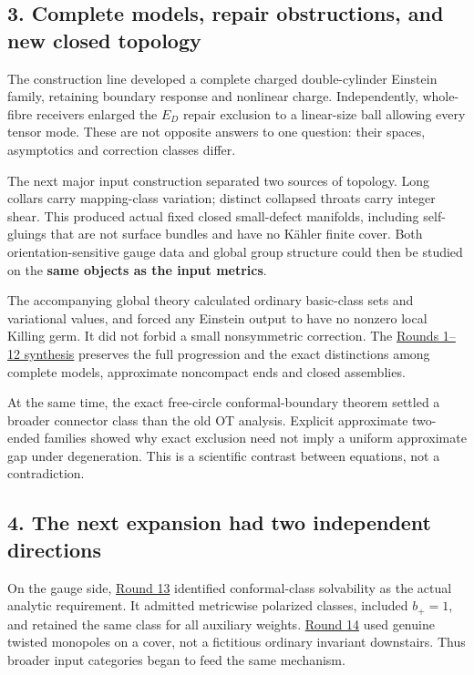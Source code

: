 \documentclass[
  10pt,
]{article}
\begin{document}
\hypertarget{complete-models-repair-obstructions-and-new-closed-topology}{%
\subsection{3. Complete models, repair obstructions, and new closed
topology}\label{complete-models-repair-obstructions-and-new-closed-topology}}

The construction line developed a complete charged double-cylinder
Einstein family, retaining boundary response and nonlinear charge.
Independently, whole-fibre receivers enlarged the \(E_D\) repair
exclusion to a linear-size ball allowing every tensor mode. These are
not opposite answers to one question: their spaces, asymptotics and
correction classes differ.

The next major input construction separated two sources of topology.
Long collars carry mapping-class variation; distinct collapsed throats
carry integer shear. This produced actual fixed closed small-defect
manifolds, including self-gluings that are not surface bundles and have
no Kähler finite cover. Both orientation-sensitive gauge data and global
group structure could then be studied on the \textbf{same objects as the
input metrics}.

The accompanying global theory calculated ordinary basic-class sets and
variational values, and forced any Einstein output to have no nonzero
local Killing germ. It did not forbid a small nonsymmetric correction.
The \href{../mathematics/current/SYNTHESIS.md}{Rounds 1--12 synthesis}
preserves the full progression and the exact distinctions among complete
models, approximate noncompact ends and closed assemblies.

At the same time, the exact free-circle conformal-boundary theorem
settled a broader connector class than the old OT analysis. Explicit
approximate two-ended families showed why exact exclusion need not imply
a uniform approximate gap under degeneration. This is a scientific
contrast between equations, not a contradiction.

\hypertarget{the-next-expansion-had-two-independent-directions}{%
\subsection{4. The next expansion had two independent
directions}\label{the-next-expansion-had-two-independent-directions}}

On the gauge side,
\href{../mathematics/current/round13_chamber.md}{Round 13} identified
conformal-class solvability as the actual analytic requirement. It
admitted metricwise polarized classes, included \(b_+=1\), and retained
the same class for all auxiliary weights.
\href{../mathematics/current/round14_twisted_rigidity.md}{Round 14} used
genuine twisted monopoles on a cover, not a fictitious ordinary
invariant downstairs. Thus broader input categories began to feed the
same mechanism.
\end{document}
